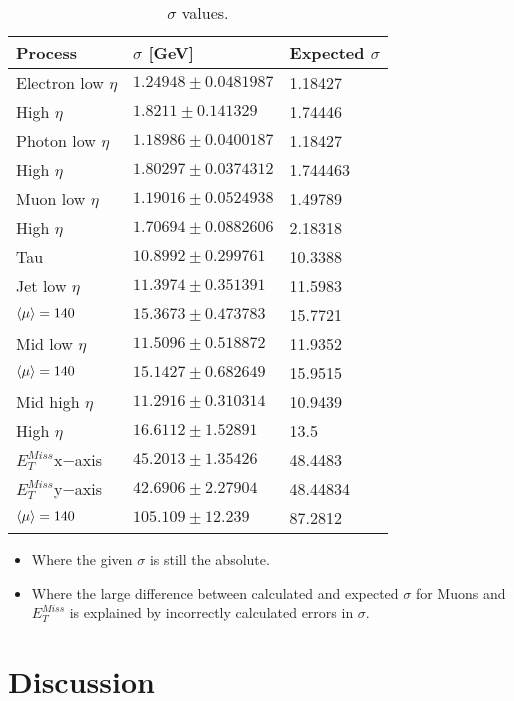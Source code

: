 \begin{table}[H]
\begin{center}
\begin{tabular}{|l|l|l|}
\hline
Process&$\sigma$ [GeV]&Expected $\sigma$\\ \hline
Electron low $\eta$&$1.24948 \pm 0.0481987$&1.18427\\
High $\eta$&$1.8211 \pm 0.141329$&1.74446\\ \hline
Photon low $\eta$&$1.18986 \pm 0.0400187$&1.18427\\
High $\eta$&$1.80297 \pm 0.0374312$&1.744463\\ \hline
Muon low $\eta$&$1.19016 \pm 0.0524938$&1.49789\\
High $\eta$&$1.70694 \pm 0.0882606$&2.18318\\ \hline
Tau&$10.8992 \pm 0.299761$&10.3388\\ \hline
Jet low $\eta$&$11.3974 \pm 0.351391$&11.5983\\
$\left<\mu\right>=140$&$15.3673 \pm 0.473783$&15.7721\\
Mid low $\eta$&$11.5096 \pm 0.518872$&11.9352\\
$\left<\mu\right>=140$&$15.1427 \pm 0.682649$&15.9515\\
Mid high $\eta$&$11.2916 \pm 0.310314$&10.9439\\
High $\eta$&$16.6112 \pm 1.52891$&13.5\\ \hline
$E_T^{Miss} $x$-$axis&$45.2013 \pm 1.35426$&48.4483\\ \hline
$E_T^{Miss} $y$-$axis&$42.6906 \pm 2.27904$&48.44834\\ 
$\left<\mu\right>=140$&$105.109 \pm 12.239$&87.2812\\  \hline
\end{tabular}
\end{center}
\caption{$\sigma$ values.}
\label{tab:sigmaval}
\end{table}
\begin{itemize}
\item Where the given $\sigma$ is still the absolute. 
\item Where the large difference between calculated and expected $\sigma$ for Muons and $E_T^{Miss}$ is explained by incorrectly calculated errors in $\sigma$.  
\end{itemize}
\newpage
\section{Discussion}
